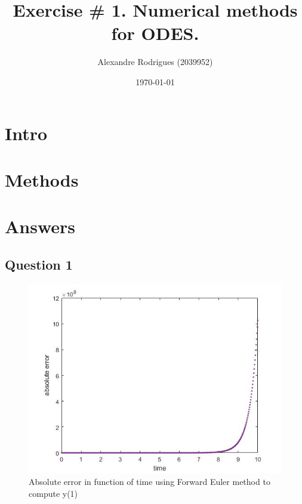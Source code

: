 \documentclass[a4paper, 11pt]{article}
\begin{document}
	
	\title{Exercise \# 1. Numerical methods for ODES. }
	\author{{\small Alexandre Rodrigues (2039952)}}
	\date{\today}
	
	\maketitle
	
	\section*{Intro}
	
	\section*{Methods}
	
	
	\section*{Answers}
		\subsection*{Question 1}
			\begin{figure}[H]
				\centering
				\includegraphics[width=\linewidth]{ex1_fe.jpg}
				\caption{Absolute error in function of time using Forward Euler method to compute y(1)}
				\label{fig:ex1_fe}
			\end{figure}
		
\end{document}
